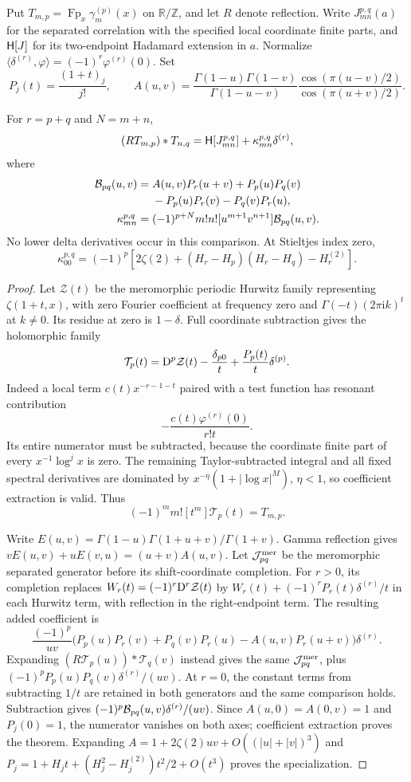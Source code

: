 Put $T_{m,p}=\operatorname{Fp}_x\gamma_m^{(p)}(x)$ on
$\mathbb R/\mathbb Z$, and let $R$ denote reflection. Write $J_{mn}^{p,q}(a)$
for the separated correlation with the specified local coordinate finite
parts, and $\mathsf H[J]$ for its two-endpoint Hadamard extension in $a$.
Normalize $\langle\delta^{(r)},\varphi\rangle=(-1)^r\varphi^{(r)}(0)$.
Set
\[
 P_j(t)=\frac{(1+t)_j}{j!},\qquad
 A(u,v)=\frac{\Gamma(1-u)\Gamma(1-v)}{\Gamma(1-u-v)}
 \frac{\cos(\pi(u-v)/2)}{\cos(\pi(u+v)/2)}.
\]
\begin{theorem}
\label{pcc:theorem}
For $r=p+q$ and $N=m+n$,
\[
 (RT_{m,p})*T_{n,q}=\mathsf H[J_{mn}^{p,q}]
       +\kappa_{mn}^{p,q}\delta^{(r)},
\]
where
\begin{align*}
\mathcal B_{pq}(u,v)={}&A(u,v)P_r(u+v)+P_p(u)P_q(v)\\
 &-P_p(u)P_r(v)-P_q(v)P_r(u),\\
\kappa_{mn}^{p,q}={}&(-1)^{p+N}m!n!
 [u^{m+1}v^{n+1}]\mathcal B_{pq}(u,v).
\end{align*}
No lower delta derivatives occur in this comparison. At Stieltjes index zero,
\[
 \kappa_{00}^{p,q}=(-1)^p\left[2\zeta(2)
 +(H_r-H_p)(H_r-H_q)-H_r^{(2)}\right].
\]
\end{theorem}
\begin{proof}
Let $\mathcal Z(t)$ be the meromorphic periodic Hurwitz family representing
$\zeta(1+t,x)$, with zero Fourier coefficient at frequency zero and
$\Gamma(-t)(2\pi\mathrm i k)^t$ at $k\ne0$. Its residue at zero is
$1-\delta$. Full coordinate subtraction gives the holomorphic family
\[
 \mathcal T_p(t)=\mathrm D^p\mathcal Z(t)-\frac{\delta_{p0}}t
                  +\frac{P_p(t)}t\delta^{(p)}.
\]
Indeed a local term $c(t)x^{-r-1-t}$ paired with a test function has resonant
contribution
\[-\frac{c(t)\varphi^{(r)}(0)}{r!t}.\]
Its entire numerator must be
subtracted, because the coordinate finite part of every
$x^{-1}\log^j x$ is zero. The remaining Taylor-subtracted integral and all
fixed spectral derivatives are dominated by $x^{-\eta}(1+|\log x|^M)$,
$\eta<1$, so coefficient extraction is valid. Thus
\[(-1)^m m![t^m]\mathcal T_p(t)=T_{m,p}.\]

Write $E(u,v)=\Gamma(1-u)\Gamma(1+u+v)/\Gamma(1+v)$. Gamma reflection gives
$vE(u,v)+uE(v,u)=(u+v)A(u,v)$. Let $\mathcal J^{\rm mer}_{pq}$ be the
meromorphic separated generator before its shift-coordinate completion.
For $r>0$, its completion replaces
$W_r(t)=(-1)^r\mathrm D^r\mathcal Z(t)$ by
$W_r(t)+(-1)^rP_r(t)\delta^{(r)}/t$ in each Hurwitz term, with reflection
in the right-endpoint term. The resulting added coefficient is
\[
 \frac{(-1)^p}{uv}
 \big(P_p(u)P_r(v)+P_q(v)P_r(u)-A(u,v)P_r(u+v)\big)
 \delta^{(r)}.
\]
Expanding $(R\mathcal T_p(u))*\mathcal T_q(v)$ instead gives the same
$\mathcal J^{\rm mer}_{pq}$, plus
$(-1)^pP_p(u)P_q(v)\delta^{(r)}/(uv)$. At $r=0$, the constant terms from
subtracting $1/t$ are retained in both generators and the same comparison
holds. Subtraction gives $(-1)^p\mathcal B_{pq}(u,v)\delta^{(r)}/(uv)$.
Since $A(u,0)=A(0,v)=1$ and $P_j(0)=1$, the numerator vanishes on both axes;
coefficient extraction proves the theorem. Expanding
$A=1+2\zeta(2)uv+O((|u|+|v|)^3)$ and
$P_j=1+H_jt+(H_j^2-H_j^{(2)})t^2/2+O(t^3)$ proves the specialization.
\end{proof}

